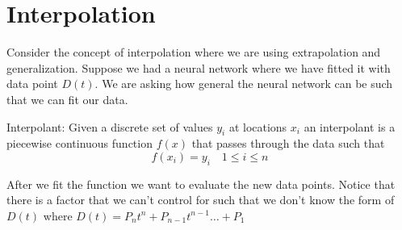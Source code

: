 \chapter{Interpolation}

Consider the concept of interpolation where we are using extrapolation and generalization. Suppose we had a neural network where we have fitted it with data point \(D(t)\). We are asking how general the neural network can be 
such that we can fit our data.  

\begin{definition}
    Interpolant: Given a discrete set of values \(y_i\) at locations \(x_i \)  an interpolant is a piecewise continuous function \(f(x)\)  that 
    passes through the data such that 
    \[
        f(x_i) = y_i \quad 1 \leq i \leq  n
    \]
\end{definition}
After we fit the function we want to evaluate the new data points. Notice that there is a factor that we can't control for such that 
we don't know the form of \(D(t)\) where \(D(t) = P_n t^n + P_{n-1}t^{n-1} \dots + P_1  \)  

